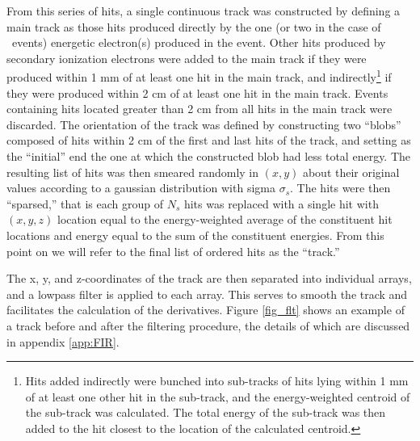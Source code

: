 \documentclass{JINST}
\begin{document}
From this series of hits, a single continuous track was constructed by defining a main track as those hits produced directly by the one (or two in the case of \bbonu\ events) energetic electron(s) produced in the event.  Other hits produced by secondary ionization electrons were added to the main track if they were produced within 1 mm of at least one hit in the main track, and indirectly\footnote{Hits added indirectly were bunched into sub-tracks of hits lying within 1 mm of at least one other hit in the sub-track, and the energy-weighted centroid of the sub-track was calculated.  The total energy of the sub-track was then added to the hit closest to the location of the calculated centroid.} if they were produced within 2 cm of at least one hit in the main track.  Events containing hits located greater than 2 cm from all hits in the main track were discarded.  The orientation of the track was defined by constructing two ``blobs'' composed of hits within 2 cm of the first and last hits of the track, and setting as the ``initial'' end the one at which the constructed blob had less total energy.  The resulting list of hits was then smeared randomly in $(x,y)$ about their original values according to a gaussian distribution with sigma $\sigma_{s}$.  The hits were then ``sparsed,'' that is each group of $N_{s}$ hits was replaced with a single hit with $(x,y,z)$ location equal to the energy-weighted average of the constituent hit locations and energy equal to the sum of the constituent energies.  From this point on we will refer to the final list of ordered hits as the ``track.''

The x, y, and z-coordinates of the track are then separated into individual arrays, and a lowpass 
filter is applied to each array.  This serves to smooth the track and facilitates the calculation of 
the derivatives.  Figure \ref{fig_flt} shows an example of a track before and after the filtering procedure, the
details of which are discussed in appendix \ref{app:FIR}.
\end{document}

